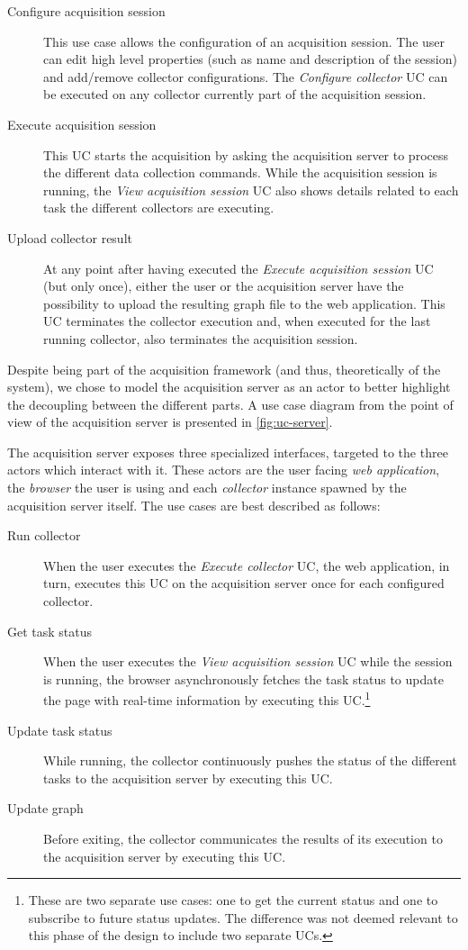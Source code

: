 \begin{description}
  \item[Configure acquisition session] This use case allows the configuration of an acquisition session. The user can edit high level properties (such as name and description of the session) and add/remove collector configurations. The \emph{Configure collector} UC can be executed on any collector currently part of the acquisition session.
  \item[Execute acquisition session] This UC starts the acquisition by asking the acquisition server to process the different data collection commands. While the acquisition session is running, the \emph{View acquisition session} UC also shows details related to each task the different collectors are executing.
  \item[Upload collector result] At any point after having executed the \emph{Execute acquisition session} UC (but only once), either the user or the acquisition server have the possibility to upload the resulting graph file to the web application. This UC terminates the collector execution and, when executed for the last running collector, also terminates the acquisition session.
\end{description}

Despite being part of the acquisition framework (and thus, theoretically of the system), we chose to model the acquisition server as an actor to better highlight the decoupling between the different parts. A use case diagram from the point of view of the acquisition server is presented in \vref{fig:uc-server}.

The acquisition server exposes three specialized interfaces, targeted to the three actors which interact with it. These actors are the user facing \emph{web application}, the \emph{browser} the user is using and each \emph{collector} instance spawned by the acquisition server itself. The use cases are best described as follows:

\begin{description}
  \item[Run collector] When the user executes the \emph{Execute collector} UC, the web application, in turn, executes this UC on the acquisition server once for each configured collector.
  \item[Get task status] When the user executes the \emph{View acquisition session} UC while the session is running, the browser asynchronously fetches the task status to update the page with real-time information by executing this UC.\footnote{These are two separate use cases: one to get the current status and one to subscribe to future status updates. The difference was not deemed relevant to this phase of the design to include two separate UCs.}
  \item[Update task status] While running, the collector continuously pushes the status of the different tasks to the acquisition server by executing this UC.
  \item[Update graph] Before exiting, the collector communicates the results of its execution to the acquisition server by executing this UC.
\end{description}


